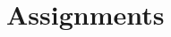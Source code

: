 \documentclass{article}
\author{Leopold Lemmermann}
\begin{document}
\createtitle

\section{Assignments}

\end{document}

